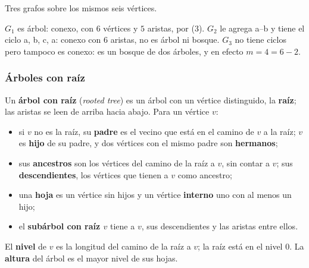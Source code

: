 \documentclass[11pt,letterpaper]{article}
\begin{document}
\begin{ejemplo}
  \label{ej:arbol-tres}
  Tres grafos sobre los mismos seis vértices.
  \begin{center}
  \end{center}
  $G_1$ es árbol: conexo, con $6$ vértices y $5$ aristas, por (3).
  $G_2$ le agrega a--b y tiene el ciclo a, b, c, a: conexo con $6$
  aristas, no es árbol ni bosque. $G_3$ no tiene ciclos pero tampoco
  es conexo: es un bosque de dos árboles, y en efecto
  $m = 4 = 6 - 2$.
\end{ejemplo}

\subsubsection*{Árboles con raíz}

\begin{definicion}
  \label{def:arbol-raiz}
  Un \textbf{árbol con raíz} (\textit{rooted tree}) es un árbol con un
  vértice distinguido, la \textbf{raíz}; las aristas se leen de arriba
  hacia abajo. Para un vértice $v$:
  \begin{itemize}[itemsep=0.1em]
    \item si $v$ no es la raíz, su \textbf{padre} es el vecino que
          está en el camino de $v$ a la raíz; $v$ es \textbf{hijo} de
          su padre, y dos vértices con el mismo padre son
          \textbf{hermanos};
    \item sus \textbf{ancestros} son los vértices del camino de la
          raíz a $v$, sin contar a $v$; sus \textbf{descendientes},
          los vértices que tienen a $v$ como ancestro;
    \item una \textbf{hoja} es un vértice sin hijos y un vértice
          \textbf{interno} uno con al menos un hijo;
    \item el \textbf{subárbol con raíz $v$} tiene a $v$, sus
          descendientes y las aristas entre ellos.
  \end{itemize}
  El \textbf{nivel} de $v$ es la longitud del camino de la raíz a $v$;
  la raíz está en el nivel $0$. La \textbf{altura} del árbol es el
  mayor nivel de sus hojas.
\end{definicion}
\end{document}
